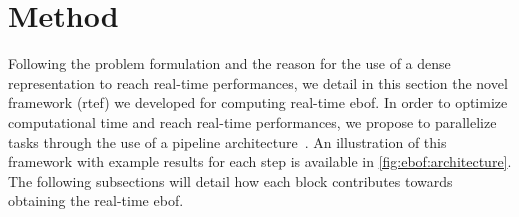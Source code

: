 \section{Method}\label{sec:ebof:method}
Following the problem formulation and the reason for the use of a dense representation to reach real-time performances, we detail in this section the novel framework (\acrshort{rtef}) we developed for computing real-time \acrshort{ebof}. In order to optimize computational time and reach real-time performances, we propose to parallelize tasks through the use of a pipeline architecture~\cite{Ramamoorthy1977PipelineA}. An illustration of this framework with example results for each step is available in \cref{fig:ebof:architecture}. The following subsections will detail how each block contributes towards obtaining the real-time \acrshort{ebof}.

